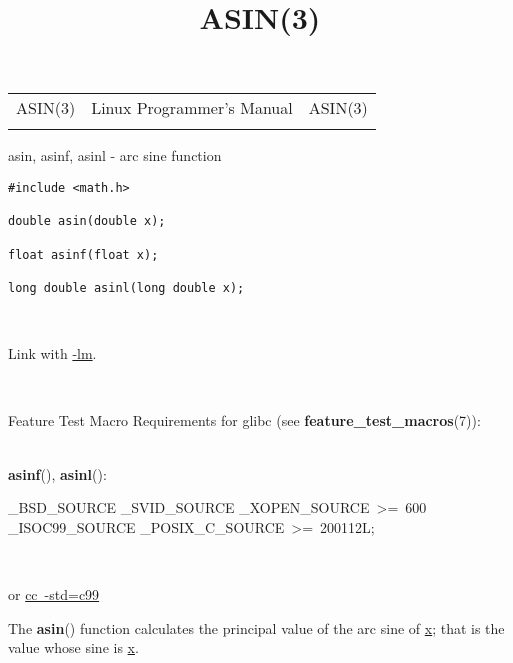 \documentclass[]{article}
\title{ASIN(3)}
\author{}
\date{}
\let\realtextbf=\textbf
\renewcommand{\textbf}[1]{\textcolor{boldcolor}{\realtextbf{#1}}}
\renewcommand{\emph}[1]{\underline{#1}}
\begin{document}
\maketitle

\begin{longtable}[c]{@{}lll@{}}
\toprule\addlinespace
ASIN(3) & Linux Programmer's Manual & ASIN(3)
\\\addlinespace
\bottomrule
\end{longtable}


asin, asinf, asinl - arc sine function


\begin{verbatim}
#include <math.h>
 
double asin(double x);
 
float asinf(float x);
 
long double asinl(long double x);
\end{verbatim}

~

Link with \emph{-lm}.

~

Feature Test Macro Requirements for glibc (see
\textbf{feature\_test\_macros}(7)): \\

~

\textbf{asinf}(), \textbf{asinl}():

\_BSD\_SOURCE \textbar{}\textbar{} \_SVID\_SOURCE \textbar{}\textbar{}
\_XOPEN\_SOURCE~\textgreater{}=~600 \textbar{}\textbar{}
\_ISOC99\_SOURCE \textbar{}\textbar{}
\_POSIX\_C\_SOURCE~\textgreater{}=~200112L;

~

or \emph{cc~-std=c99}


The \textbf{asin}() function calculates the principal value of the arc
sine of \emph{x}; that is the value whose sine is \emph{x}.
\end{document}

